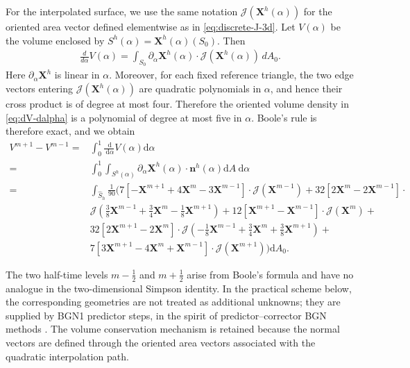 \documentclass[smallextended]{svjour3}
\numberwithin{equation}{section}
\begin{document}
	For the interpolated surface, we use the same notation $\mathcal J(\mathbf X^h(\alpha))$ for the oriented area vector defined elementwise as in \eqref{eq:discrete-J-3d}. Let $V(\alpha)$ be the volume enclosed by $S^h(\alpha)=\mathbf X^h(\alpha)(S_0)$. Then
	\begin{equation}
		\begin{aligned}
			\frac{d}{d\alpha}V(\alpha)
			=
			\int_{S_0}
			\partial_\alpha\mathbf{X}^h(\alpha)\cdot
			\mathcal{J}(\mathbf{X}^h(\alpha))\,dA_0.
		\end{aligned}
		\label{eq:dV-dalpha}
	\end{equation}
	Here $\partial_\alpha\mathbf X^h$ is linear in $\alpha$. Moreover, for each fixed reference triangle, the two edge vectors entering $\mathcal J(\mathbf X^h(\alpha))$ are quadratic polynomials in $\alpha$, and hence their cross product is of degree at most four. Therefore the oriented volume density in \eqref{eq:dV-dalpha} is a polynomial of degree at most five in $\alpha$. Boole's rule is therefore exact, and we obtain
	\begin{equation}
		\begin{aligned}
			V^{m+1}-V^{m-1}= & \int_0^1 \frac{\mathrm{~d}}{\mathrm{~d} \alpha} V(\alpha) \mathrm{d} \alpha \\
			= & \int_0^1 \int_{S^h(\alpha)}\partial_\alpha \mathbf{X}^h(\alpha) \cdot \boldsymbol{n}^h(\alpha) \mathrm{d} A \mathrm{~d} \alpha \\
			= & 
			\int_{\widehat S_h}\frac{1}{90}(7[-\mathbf{X}^{m+1}+4\mathbf{X}^m-3\mathbf{X}^{m-1}] \cdot \mathcal{J}(\mathbf{X}^{m-1})+32[2\mathbf{X}^m-2\mathbf{X}^{m-1}] \cdot \\ &\mathcal{J}(\frac{3}{8}\mathbf{X}^{m-1} + \frac{3}{4}\mathbf{X}^{m} - \frac{1}{8}\mathbf{X}^{m+1}) + 12[\mathbf{X}^{m+1}-\mathbf{X}^{m-1}] \cdot \mathcal{J}(\mathbf{X}^m) + \\ & 32[2\mathbf{X}^{m+1}-2\mathbf{X}^{m}] \cdot \mathcal{J}(-\frac{1}{8}\mathbf{X}^{m-1} + \frac{3}{4}\mathbf{X}^m + \frac{3}{8}\mathbf{X}^{m+1}) + \\ & 7[3\mathbf{X}^{m+1}-4\mathbf{X}^m + \mathbf{X}^{m-1}] \cdot \mathcal{J}(\mathbf{X}^{m+1})) \mathrm{d} A_0.
		\end{aligned}
		\label{eq:volume-identity-3d}
	\end{equation}
	
	\begin{remark}
		The two half-time levels $m-\frac12$ and $m+\frac12$ arise from Boole's formula and have no analogue in the two-dimensional Simpson identity. In the practical scheme below, the corresponding geometries are not treated as additional unknowns; they are supplied by BGN1 predictor steps, in the spirit of predictor--corrector BGN methods \cite{jiang2025predictor}. The volume conservation mechanism is retained because the normal vectors are defined through the oriented area vectors associated with the quadratic interpolation path.
	\end{remark}
	
\end{document}
